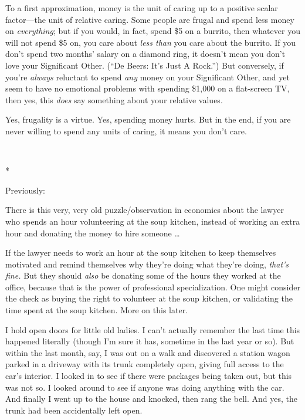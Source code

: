 {
 To a first approximation, money is the unit of caring up to a
positive scalar factor---the unit of relative caring. Some people are
frugal and spend less money on \textit{everything}; but if you would,
in fact, spend \$5 on a burrito, then whatever you will not spend \$5
on, you care about \textit{less than} you care about the burrito. If
you don't spend two months' salary on a
diamond ring, it doesn't mean you don't
love your Significant Other. (``De Beers:
It's Just A Rock.'') But conversely,
if you're \textit{always} reluctant to spend
\textit{any} money on your Significant Other, and yet seem to have no
emotional problems with spending \$1,000 on a flat-screen TV, then yes,
this \textit{does} say something about your relative values.}

{
 Yes, frugality is a virtue. Yes, spending money hurts. But in the
end, if you are never willing to spend any units of caring, it means
you don't care.}

{\centering
 \ ~
\par}

{\centering
 *
\par}


{
 Previously:}

{
 There is this very, very old puzzle/observation in economics about
the lawyer who spends an hour volunteering at the soup kitchen, instead
of working an extra hour and donating the money to hire someone \ldots}

{
 If the lawyer needs to work an hour at the soup kitchen to keep
themselves motivated and remind themselves why they're
doing what they're doing,
\textit{that's fine.} But they should \textit{also} be
donating some of the hours they worked at the office, because that is
the power of professional specialization. One might consider the check
as buying the right to volunteer at the soup kitchen, or validating the
time spent at the soup kitchen. More on this later.}

{
 I hold open doors for little old ladies. I can't
actually remember the last time this happened literally (though
I'm sure it has, sometime in the last year or so). But
within the last month, say, I was out on a walk and discovered a
station wagon parked in a driveway with its trunk completely open,
giving full access to the car's interior. I looked in
to see if there were packages being taken out, but this was not so. I
looked around to see if anyone was doing anything with the car. And
finally I went up to the house and knocked, then rang the bell. And
yes, the trunk had been accidentally left open.}

